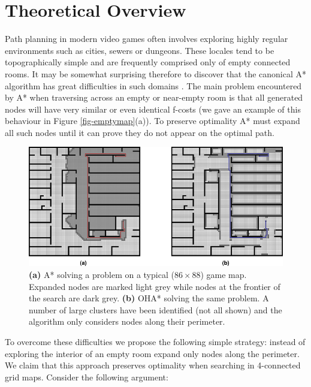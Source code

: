 \section{Theoretical Overview}
Path planning in modern video games often involves exploring highly regular 
environments such as cities, sewers or dungeons.
These locales tend to be topographically simple and are frequently comprised only
of empty connected rooms.
It may be somewhat surprising therefore to discover that the canonical A* 
algorithm\cite{hart68} has great difficulties in such domains .
The main problem encountered by A* when traversing across an empty or near-empty 
room is that all generated nodes will have very similar or even identical f-costs
(we gave an example of this behaviour in Figure \ref{fig-emptymap}(a)).
To preserve optimality A* must expand all such nodes until it can prove they do 
not appear on the optimal path.
\begin{figure}[htbp]
	\label{fig-oha_contrast}
	\vspace{-4pt}
       \begin{center}
           \includegraphics[scale=0.60, trim = 10mm 10mm 10mm 0mm]{diagrams/oha_contrast.png}
       \end{center}
	\vspace{-3pt}
       \caption{\textbf{(a)} A* solving a problem on a typical ($86\times88$) game map. 
Expanded nodes are marked light grey while nodes at the frontier of the search are dark grey.
\textbf{(b)} OHA* solving the same problem. A number of large clusters have been identified (not
all shown) and the algorithm only considers nodes along their perimeter.}
       \label{fig-ohacontrast}
	\vspace{-15pt}
\end{figure}

\par
To overcome these difficulties we propose the following simple strategy:
instead of exploring the interior of an empty room expand only nodes along the
perimeter. We claim that this approach preserves optimality when searching in 
4-connected grid maps. 
Consider the following argument:

